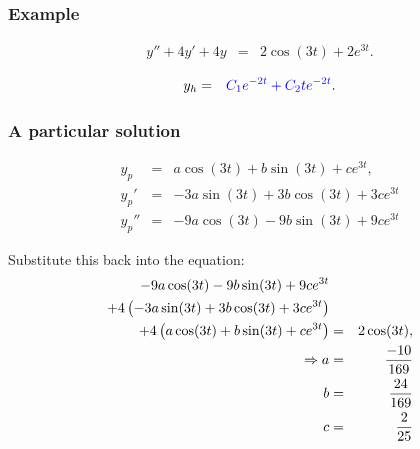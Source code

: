\begin{frame}
  \frametitle{Example}

  \begin{eqnarray*}
    y'' + 4y' + 4y & = & 2 \cos(3t) + 2e^{3t}.
  \end{eqnarray*}

  {
    \begin{eqnarray*}
      y_h & = & {\color{blue}C_1 e^{-2t} + C_2 t e^{-2t}}.
    \end{eqnarray*}
  }

\end{frame}


\begin{frame}
  \frametitle{A particular solution}

  \begin{eqnarray*}
    y_p & = & a \cos(3t) + b \sin(3t) + ce^{3t}, \\
    y_p' & = & -3 a \sin(3t) + 3b \cos(3t) + 3 c e^{3t}\\
    y_p'' & = & -9 a \cos(3t) - 9b \sin(3t) + 9 c e^{3t}
  \end{eqnarray*}

  Substitute this back into the equation:
  \begin{eqnarray*}
    -9 a \cos(3t) - 9b \sin(3t) + 9 c e^{3t} & & \\
    + 4 \left( -3 a \sin(3t) + 3b \cos(3t) + 3c e^{3t}\right)  & & \\
    + 4 \left( a \cos(3t) + b \sin(3t) + c e^{3t}\right)
     & = & 2 \cos(3t), \\
    \Rightarrow
    a & = & \frac{-10}{169} \\
    b & = & \frac{24}{169} \\
    c & = & \frac{2}{25}
  \end{eqnarray*}


\end{frame}


